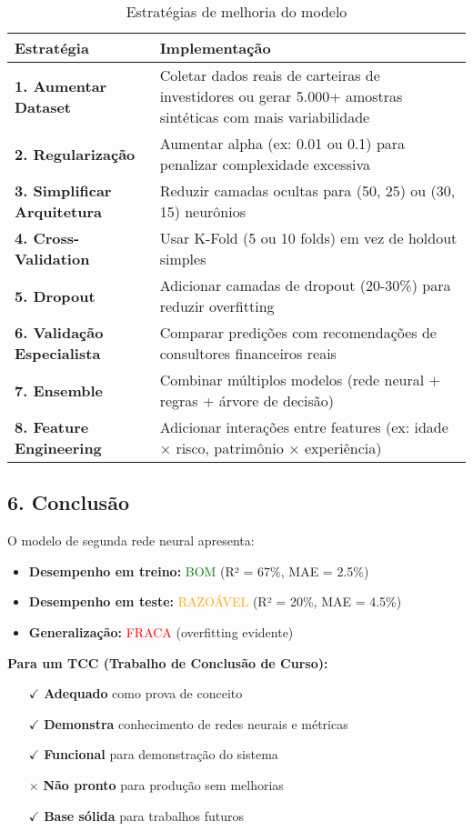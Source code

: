 \documentclass[12pt]{article}
\begin{document}
\begin{table}[h!]
\centering
\begin{tabular}{p{4cm}p{9cm}}
\toprule
\textbf{Estratégia} & \textbf{Implementação} \\
\midrule
\textbf{1. Aumentar Dataset} &
Coletar dados reais de carteiras de investidores ou gerar 5.000+ amostras sintéticas com mais variabilidade \\
\midrule
\textbf{2. Regularização} &
Aumentar alpha (ex: 0.01 ou 0.1) para penalizar complexidade excessiva \\
\midrule
\textbf{3. Simplificar Arquitetura} &
Reduzir camadas ocultas para (50, 25) ou (30, 15) neurônios \\
\midrule
\textbf{4. Cross-Validation} &
Usar K-Fold (5 ou 10 folds) em vez de holdout simples \\
\midrule
\textbf{5. Dropout} &
Adicionar camadas de dropout (20-30\%) para reduzir overfitting \\
\midrule
\textbf{6. Validação Especialista} &
Comparar predições com recomendações de consultores financeiros reais \\
\midrule
\textbf{7. Ensemble} &
Combinar múltiplos modelos (rede neural + regras + árvore de decisão) \\
\midrule
\textbf{8. Feature Engineering} &
Adicionar interações entre features (ex: idade × risco, patrimônio × experiência) \\
\bottomrule
\end{tabular}
\caption{Estratégias de melhoria do modelo}
\end{table}

\subsection*{6. Conclusão}

O modelo de segunda rede neural apresenta:

\begin{itemize}
    \item \textbf{Desempenho em treino:} \textcolor{green}{BOM} (R² = 67\%, MAE = 2.5\%)
    \item \textbf{Desempenho em teste:} \textcolor{orange}{RAZOÁVEL} (R² = 20\%, MAE = 4.5\%)
    \item \textbf{Generalização:} \textcolor{red}{FRACA} (overfitting evidente)
\end{itemize}

\textbf{Para um TCC (Trabalho de Conclusão de Curso):}
\begin{itemize}
    \item[$\checkmark$] \textbf{Adequado} como prova de conceito
    \item[$\checkmark$] \textbf{Demonstra} conhecimento de redes neurais e métricas
    \item[$\checkmark$] \textbf{Funcional} para demonstração do sistema
    \item[$\times$] \textbf{Não pronto} para produção sem melhorias
    \item[$\checkmark$] \textbf{Base sólida} para trabalhos futuros
\end{itemize}
\end{document}
